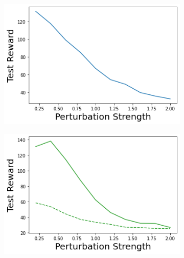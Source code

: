 \begin{figure}
\begin{subfigure}{.24\textwidth}
    \end{subfigure}
    \begin{subfigure}{.24\textwidth}
        \includegraphics[width=\textwidth]{sections/011_icml2022/resources/state_shift-DKL-CartPoleShift-v0-mean_reward_.png}
    \end{subfigure}
    \begin{subfigure}{.24\textwidth}
        \includegraphics[width=\textwidth]{sections/011_icml2022/resources/state_shift-PostNet-CartPoleShift-v0-mean_reward_.png}
    \end{subfigure}
    

\end{figure}
